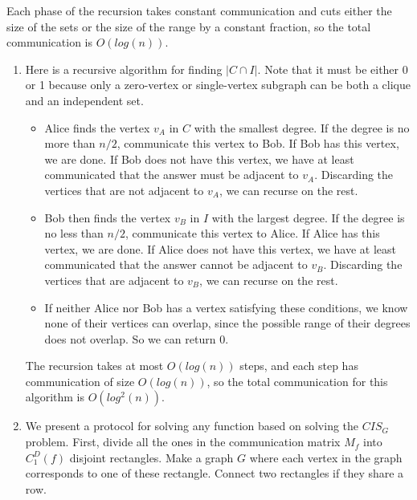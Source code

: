 \documentclass{article}
\newenvironment{problem}[2][Problem]{\begin{trivlist}
\item[\hskip \labelsep {\bfseries #1}\hskip \labelsep {\bfseries #2.}]}{\end{trivlist}}
\begin{document}
\begin{problem}{4}
  Each phase of the recursion takes constant communication and cuts
  either the size of the sets or the size of the range by a constant
  fraction, so the total communication is $O(log(n))$.
\end{problem}

\begin{problem}{5}
  \begin{enumerate}
  \item Here is a recursive algorithm for finding
    $|C \cap I|$. Note that it must be either 0 or 1 because only a
    zero-vertex or single-vertex subgraph can be both a clique and an independent
    set.

    \begin{itemize}
      \item Alice finds the vertex $v_A$ in $C$ with the smallest degree. If
        the degree is no more than $n/2$, communicate this vertex to
        Bob. If Bob has this vertex, we are done. If Bob does not have
        this vertex, we have at least communicated that the answer
        must be adjacent to $v_A$. Discarding the vertices that are not
        adjacent to $v_A$, we can recurse on the rest.
      \item Bob then finds the vertex $v_B$ in $I$ with the largest
        degree. If the degree is no less than $n/2$, communicate
        this vertex to Alice. If Alice has this vertex, we are
        done. If Alice does not have this vertex, we have at least
        communicated that the answer cannot be adjacent to
        $v_B$. Discarding the vertices that are adjacent to $v_B$,
          we can recurse on the rest.
      \item If neither Alice nor Bob has a vertex satisfying these
        conditions, we know none of their vertices can overlap, since
        the possible range of their degrees does not overlap. So we
        can return 0.
    \end{itemize}

    The recursion takes at most $O(log(n))$ steps, and each step has
    communication of size $O(log(n))$, so the total communication for
    this algorithm is $O(log^2(n))$.

    \item We present a protocol for solving any function based on
      solving the $CIS_G$ problem. First, divide all the ones in the
      communication matrix $M_f$ into $C_1^D(f)$ disjoint
      rectangles. Make a graph $G$ where each vertex in the graph
      corresponds to one of these rectangle. Connect two rectangles if
      they share a row.


\end{enumerate}
\end{problem}
\end{document}
